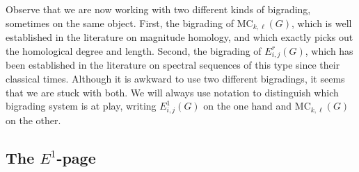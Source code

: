 \documentclass[a4paper, 11 pt, oneside, reqno]{amsart}
\numberwithin{lemma}{section}
\theoremstyle{definition}
\newcommand{\MC}{\mathrm{MC}}
\begin{document}
Observe that we are now working with two different 
kinds of bigrading, sometimes on the same object.
First, the bigrading of $\MC_{k,\ell}(G)$, which is well established
in the literature on magnitude homology, and which exactly picks out
the homological degree and length.
Second, the bigrading of $E^r_{i,j}(G)$, which has been established
in the literature on spectral sequences of this type since their
classical times.
Although it is awkward to use two different bigradings,
it seems that we are stuck with both.
We will always use notation to distinguish which bigrading system
is at play, writing $E^1_{i,j}(G)$ on the one hand and 
$\MC_{k,\ell}(G)$ on the other.

\subsection{The $E^1$-page}
\end{document}
